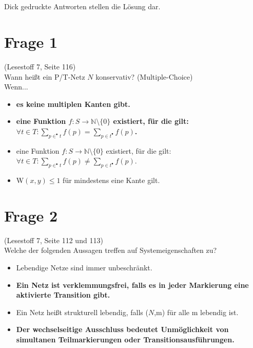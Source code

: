 \documentclass[12pt]{article}
\begin{document}
\section*{}
Dick gedruckte Antworten stellen die Lösung dar.
\section*{Frage 1}
(Lesestoff 7, Seite 116)\\
Wann heißt ein P/T-Netz $N$ konservativ? (Multiple-Choice)\\
Wenn...
\begin{itemize}
\item \textbf{es keine multiplen Kanten gibt.}
\item \textbf{eine Funktion $f:S \to \mathbb{N}\setminus \{ 0 \}$ existiert, für die gilt:$\forall t \in T: \sum_{p \in ^{\bullet}t}f(p) = \sum_{p \in t^{\bullet}}f(p)$.}
\item eine Funktion $f:S \to \mathbb{N}\setminus \{ 0 \}$ existiert, für die gilt:$\forall t \in T: \sum_{p \in ^{\bullet}t}f(p) \neq \sum_{p \in t^{\bullet}}f(p)$.
\item W$(x,y)\leq 1$ für mindestens eine Kante gilt. 
\end{itemize}
\section*{Frage 2}
(Lesestoff 7, Seite 112 und 113)\\
Welche der folgenden Aussagen treffen auf Systemeigenschaften zu?
\begin{itemize}
\item Lebendige Netze sind immer unbeschränkt.
\item \textbf{Ein Netz ist verklemmungsfrei, falls es in jeder Markierung eine aktivierte Transition gibt.}
\item Ein Netz heißt strukturell lebendig, falls ($N$,m) für alle m lebendig ist.
\item \textbf{Der wechselseitige Ausschluss bedeutet Unmöglichkeit von simultanen Teilmarkierungen oder Transitionsausführungen.}
\end{itemize}
\end{document}
